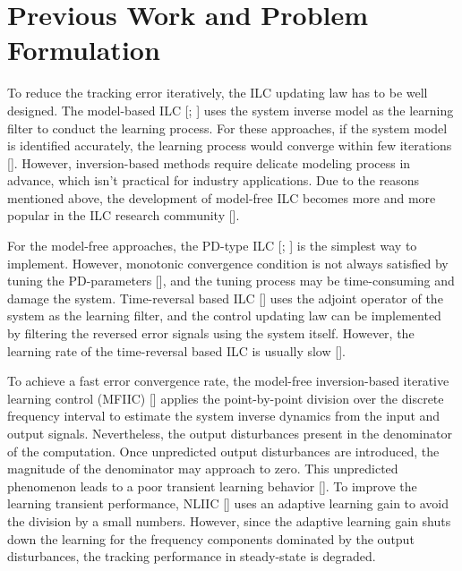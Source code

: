 \section{Previous Work and Problem Formulation}
\label{sec:Previous Work and Problem Formulation}

To reduce the tracking error iteratively, the ILC updating law has to be well designed. The model-based ILC [\cite{lee1994feedback}; \cite{harte2005discrete}] uses the system inverse model as the learning filter to conduct the learning process. For these approaches, if the system model is identified accurately, the learning process would converge within few iterations [\cite{teng2015comparison}]. However, inversion-based methods require delicate modeling process in advance, which isn't practical for industry applications. Due to the reasons mentioned above, the development of model-free ILC becomes more and more popular in the ILC research community [\cite{janssens2011model}].

For the model-free approaches, the PD-type ILC [\cite{arimoto1984bettering}; \cite{chen2006pd}] is the simplest way to implement. However, monotonic convergence condition is not always satisfied by tuning the PD-parameters [\cite{moore2005monotonically}], and the tuning process may be time-consuming and damage the system. Time-reversal based ILC [\cite{ye2005zero}] uses the adjoint operator of the system as the learning filter, and the control updating law can be implemented by filtering the reversed error signals using the system itself. However, the learning rate of the time-reversal based ILC is usually slow [\cite{chen2017data}].  

To achieve a fast error convergence rate, the model-free inversion-based iterative learning control (MFIIC) [\cite{kim2012modeling}] applies the point-by-point division over the discrete frequency interval to estimate the system inverse dynamics from the input and output signals. Nevertheless, the output disturbances present in the denominator of the computation. Once unpredicted output disturbances are introduced, the magnitude of the denominator may approach to zero. This unpredicted phenomenon leads to a poor transient learning behavior [\cite{de2018improving}]. To improve the learning transient performance, NLIIC [\cite{de2019data}] uses an adaptive learning gain to avoid the division by a small numbers. However, since the adaptive learning gain shuts down the learning for the frequency components dominated by the output disturbances, the tracking performance in steady-state is degraded.      


